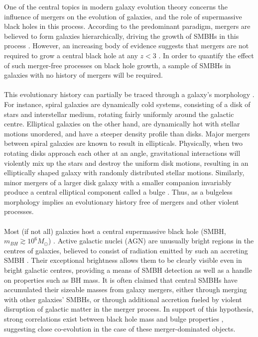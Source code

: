 \documentclass[11pt,twocolumn]{article}
\begin{document}
One of the central topics in modern galaxy evolution theory concerns the influence of mergers on the evolution of galaxies, and the role of supermassive black holes in this process. According to the predominant paradigm,  mergers are believed to form galaxies hierarchically, driving the growth of SMBHs in this process \cite{1988ApJ...325...74S} \cite{2008ApJS..175..356H} \cite{2006MNRAS.365...11C}. However, an increasing body of evidence suggests that mergers are not required to grow a central black hole at any $z< 3$ \cite{2011ApJ...727L..31S} \cite{2012ApJ...744..148K} \cite{2012ApJ...761...75S} \cite{Simmons01032013}. In order to quantify the effect of such merger-free processes on black hole growth, a sample of SMBHs in galaxies with no history of mergers will be required. 
\paragraph{} This evolutionary history can partially be traced through a galaxy's morphology \cite{1987gady.book.....B}. For instance, spiral galaxies are dynamically cold systems, consisting of a disk of stars and interstellar medium, rotating fairly uniformly around the galactic centre. Elliptical galaxies on the other hand, are dynamically hot with stellar motions unordered, and have a steeper density profile than disks. Major mergers between spiral galaxies are known to result in ellipticals. Physically, when two rotating disks approach each other at an angle, gravitational interactions will violently mix up the stars and destroy the uniform disk motions, resulting in an elliptically shaped galaxy with randomly distributed stellar motions.  Similarly, minor mergers of a larger disk galaxy with a smaller companion invariably produce a central elliptical component called a bulge . Thus, as a bulgeless morphology implies an evolutionary history free of mergers and other violent processes.

\paragraph{}Most (if not all) galaxies host a central supermassive black hole (SMBH, $ m_{BH} \gtrsim 10^6 M_{\odot}$) \cite{1998AJ....115.2285M} \cite{2004MNRAS.351..169M}. Active galactic nuclei (AGN) are unusually bright regions in the centres of galaxies, believed to consist of radiation emitted by such an accreting SMBH \cite{1969Natur.223..690L}\cite{1989ApJ...340L...5C}. Their exceptional brightness allows them to be clearly visible even in bright galactic centres, providing a means of SMBH detection as well as a handle on properties such as BH mass. It is often claimed that central SMBHs have accumulated their sizeable masses from galaxy mergers, either through merging with other galaxies' SMBHs, or through additional accretion fueled by violent disruption of galactic matter in the merger process. In support of this hypothesis, strong correlations exist between black hole mass and bulge properties \cite{2000ApJ...539L..13G}\cite{1998AJ....115.2285M}\cite{2003ApJ...589L..21M}\cite{Haring:2004hr}, suggesting close co-evolution in the case of these merger-dominated objects.
\end{document}
